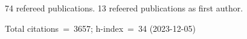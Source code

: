 74 refereed publications. 13 refeered publications as first author.

Total citations~=~3657; h-index~=~34 (2023-12-05)